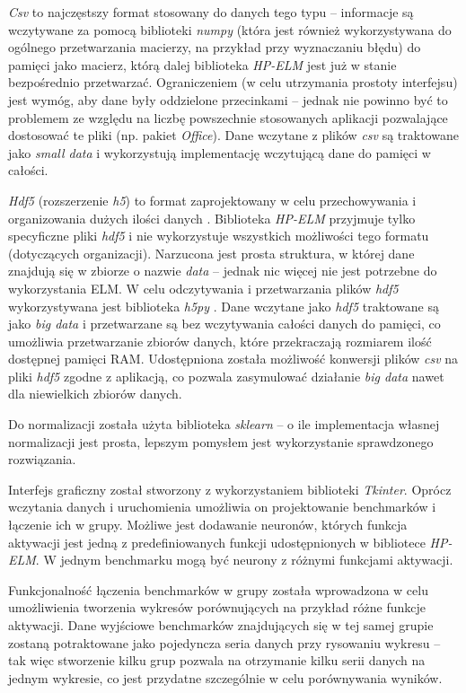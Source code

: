 \documentclass{article}
\begin{document}
\textit{Csv} to najczęstszy format stosowany do danych tego typu -- informacje są wczytywane za pomocą biblioteki \textit{numpy} \cite{numpy} (która jest również wykorzystywana do ogólnego przetwarzania macierzy, na przykład przy wyznaczaniu błędu) do pamięci jako macierz, którą dalej biblioteka \textit{HP-ELM} jest już w stanie bezpośrednio przetwarzać. Ograniczeniem (w celu utrzymania prostoty interfejsu) jest wymóg, aby dane były oddzielone przecinkami -- jednak nie powinno być to problemem ze względu na liczbę powszechnie stosowanych aplikacji pozwalające dostosować te pliki (np. pakiet \textit{Office}). Dane wczytane z plików \textit{csv} są traktowane jako \textit{small data} i wykorzystują implementację wczytującą dane do pamięci w całości. 

\textit{Hdf5} (rozszerzenie \textit{h5}) to format zaprojektowany w celu przechowywania i organizowania dużych ilości danych \cite{hdf5}. Biblioteka \textit{HP-ELM} przyjmuje tylko specyficzne pliki \textit{hdf5} i nie wykorzystuje wszystkich możliwości tego formatu (dotyczących organizacji). Narzucona jest prosta struktura, w której dane znajdują się w zbiorze o nazwie \textit{data} -- jednak nic więcej nie jest potrzebne do wykorzystania ELM. W celu odczytywania i przetwarzania plików \textit{hdf5} wykorzystywana jest biblioteka \textit{h5py} \cite{h5py}. Dane wczytane jako \textit{hdf5} traktowane są jako \textit{big data} i przetwarzane są bez wczytywania całości danych do pamięci, co umożliwia przetwarzanie zbiorów danych, które przekraczają rozmiarem ilość dostępnej pamięci RAM. Udostępniona została możliwość konwersji plików \textit{csv} na pliki \textit{hdf5} zgodne z aplikacją, co pozwala zasymulować działanie \textit{big data} nawet dla niewielkich zbiorów danych.  

Do normalizacji została użyta biblioteka \textit{sklearn} \cite{sklearn} -- o ile implementacja własnej normalizacji jest prosta, lepszym pomysłem jest wykorzystanie sprawdzonego rozwiązania.

Interfejs graficzny został stworzony z wykorzystaniem biblioteki \textit{Tkinter}. Oprócz wczytania danych i uruchomienia umożliwia on projektowanie benchmarków i łączenie ich w grupy. Możliwe jest dodawanie neuronów, których funkcja aktywacji jest jedną z predefiniowanych funkcji udostępnionych w bibliotece \textit{HP-ELM}. W jednym benchmarku mogą być neurony z różnymi funkcjami aktywacji. 

Funkcjonalność łączenia benchmarków w grupy została wprowadzona w celu umożliwienia tworzenia wykresów porównujących na przykład różne funkcje aktywacji. Dane wyjściowe benchmarków znajdujących się w tej samej grupie zostaną potraktowane jako pojedyncza seria danych przy rysowaniu wykresu -- tak więc stworzenie kilku grup pozwala na otrzymanie kilku serii danych na jednym wykresie, co jest przydatne szczególnie w celu porównywania wyników. 
\end{document}
